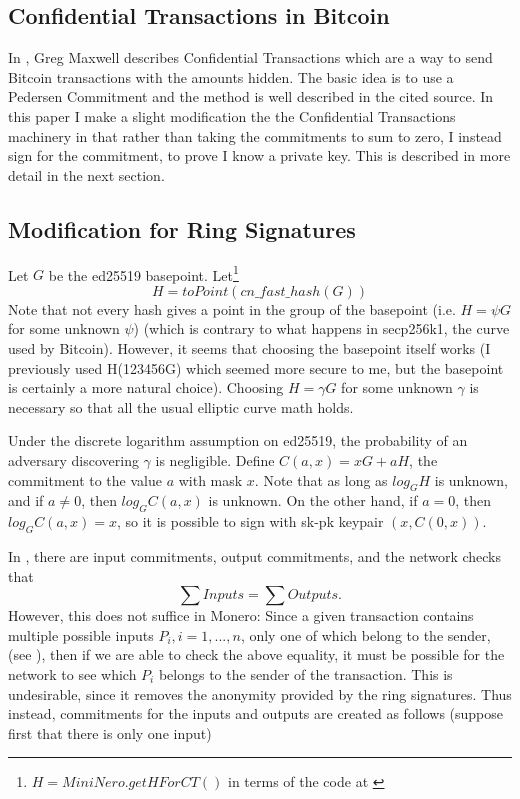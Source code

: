 \documentclass[12pt,english]{mrl}
\theoremstyle{definition}
\numberwithin{equation}{section}
\numberwithin{figure}{section}
\numberwithin{equation}{section}
\numberwithin{equation}{section}
\numberwithin{figure}{section}
\begin{document}
\subsection{Confidential Transactions in Bitcoin}

In \cite{GM}, Greg Maxwell describes Confidential Transactions which
are a way to send Bitcoin transactions with the amounts hidden. The
basic idea is to use a Pedersen Commitment and the method is well
described in the cited source. In this paper I make a slight modification
the the Confidential Transactions machinery in that rather than taking
the commitments to sum to zero, I instead sign for the commitment,
to prove I know a private key. This is described in more detail in
the next section. 


\subsection{Modification for Ring Signatures}

Let $G$ be the ed25519 basepoint. Let\footnote{$H=MiniNero.getHForCT()$ in terms of the code at \cite{Snoe}}
\[
H=toPoint\left(cn\_fast\_hash\left(G\right)\right)
\]
Note that not every hash gives a point in the group of the basepoint (i.e. $H=\psi G$ for some unknown $\psi$) (which is contrary to what happens in secp256k1, the curve used by Bitcoin). However, it seems that choosing the basepoint itself works (I previously used H(123456G) which seemed more secure to me, but the basepoint is certainly a more natural choice). 
Choosing $H = \gamma G$ for some unknown $\gamma$ is necessary so that all the usual elliptic curve math holds.

Under the discrete
logarithm assumption on ed25519, the probability of an adversary discovering $\gamma$
is negligible.  
Define $C\left(a,x\right)=xG+aH$, the commitment to the value $a$
with mask $x$. Note that as long as $log_{G}H$ is unknown, and if
$a\neq0$, then $log_{G}C\left(a,x\right)$ is unknown. On the other
hand, if $a=0$, then $log_{G}C\left(a,x\right)=x$, so it is possible
to sign with sk-pk keypair $\left(x,C\left(0,x\right)\right).$ 

In \cite{GM}, there are input commitments, output commitments, and
the network checks that 
\[
\sum Inputs=\sum Outputs.
\]
 However, this does not suffice in Monero: Since a given transaction
contains multiple possible inputs $P_{i},i=1,...,n$, only one of
which belong to the sender, (see \cite[4.4]{CN}), then if we are
able to check the above equality, it must be possible for the network
to see which $P_{i}$ belongs to the sender of the transaction. This
is undesirable, since it removes the anonymity provided by the ring
signatures. Thus instead, commitments for the inputs and outputs are
created as follows (suppose first that there is only one input)
\end{document}
